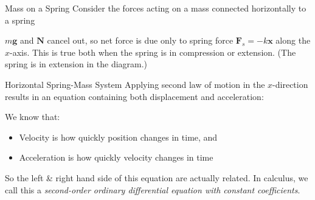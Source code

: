 \documentclass[12pt,compress,aspectratio=169]{beamer}
\newcommand{\eq}[2]{\vspace{#1}{\Large\begin{displaymath}#2\end{displaymath}}}
\begin{document}
\begin{frame}{Mass on a Spring}
  Consider the forces acting on a mass connected horizontally to a spring

  \begin{center}
  \end{center}

  \vspace{-.1in}$m\bm{g}$ and $\bm{N}$ cancel out, so net force is due only to
  spring force $\bm{F}_s=-k\bm{x}$ along the $x$-axis. This is true both when
  the spring is in compression or extension. (The spring is in extension in the
  diagram.)
\end{frame}



\begin{frame}{Horizontal Spring-Mass System}
  Applying second law of motion in the $x$-direction results in an equation
  containing both displacement and acceleration:

  \eq{-.2in}{
    \sum F=F_s=ma\quad\rightarrow\quad-\frac{k}mx=a
  }

  We know that:
  \begin{itemize}
  \item Velocity is how quickly position changes in time, and
  \item Acceleration is how quickly velocity changes in time
  \end{itemize}
  So the left \& right hand side of this equation are actually related. In
  calculus, we call this a
  \emph{second-order ordinary differential equation with constant coefficients}.
\end{frame}
\end{document}

